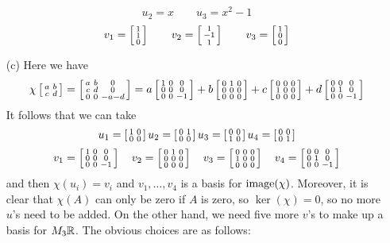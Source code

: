 \begin{itemize}
\[      u_2 = x\hspace{2em}
      u_3 = x^2-1
   \]
   \[ v_1 = \bsm 1\\1\\0 \esm \hspace{2em}
      v_2 = \bsm 1\\-1\\1 \esm \hspace{2em}
      v_3 = \bsm 1\\0\\0\esm
   \]
  \item[(c)] Here we have
   {\tiny \[ \chi\bsm a&b\\ c&d\esm =
       \bsm a & b & 0 \\ c & d & 0 \\ 0 & 0 & -a-d\esm =
       a\bsm 1&0&0\\0&0&0\\0&0&-1\esm +
       b\bsm 0&1&0\\0&0&0\\0&0&0 \esm +
       c\bsm 0&0&0\\1&0&0\\0&0&0\esm +
       d\bsm 0&0&0\\0&1&0\\0&0&-1\esm
   \]}
   It follows that we can take
   \[ u_1 = \bsm 1&0\\0&0 \esm
      u_2 = \bsm 0&1\\0&0 \esm
      u_3 = \bsm 0&0\\1&0 \esm
      u_4 = \bsm 0&0\\0&1 \esm
   \]
   \[  v_1 = \bsm 1&0&0\\0&0&0\\0&0&-1\esm \hspace{1em}
       v_2 = \bsm 0&1&0\\0&0&0\\0&0&0 \esm \hspace{1em}
       v_3 = \bsm 0&0&0\\1&0&0\\0&0&0\esm \hspace{1em}
       v_4 = \bsm 0&0&0\\0&1&0\\0&0&-1\esm
   \]
   and then $\chi(u_i)=v_i$ and $v_1,\dotsc,v_4$ is a basis
   for $\img(\chi)$.  Moreover, it is clear that $\chi(A)$
   can only be zero if $A$ is zero, so $\ker(\chi)=0$, so no
   more $u$'s need to be added.  On the other hand, we need
   five more $v$'s to make up a basis for $M_3\R$.  The
   obvious choices are as follows:

\end{itemize}
